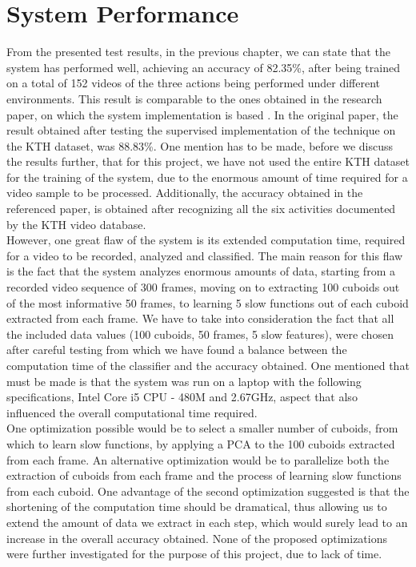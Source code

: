 \documentclass[11pt]{report}
\begin{document}
\section{System Performance}
From the presented test results, in the previous chapter, we can state that the system has performed well, achieving an accuracy of 82.35\%, after being trained on a total of 152 videos of the three actions being performed under different environments. This result is comparable to the ones obtained in the research paper, on which the system implementation is based \cite{main}. In the original paper, the result obtained after testing the supervised implementation of the technique on the KTH dataset, was 88.83\%. One mention has to be made, before we discuss the results further, that for this project, we have not used the entire KTH dataset for the training of the system, due to the enormous amount of time required for a video sample to be processed. Additionally, the accuracy obtained in the referenced paper, is obtained after recognizing all the six activities documented by the KTH video database.\\
However, one great flaw of the system is its extended computation time, required for a video to be recorded, analyzed and classified. The main reason for this flaw is the fact that the system analyzes enormous amounts of data, starting from a recorded video sequence of 300 frames, moving on to extracting 100 cuboids out of the most informative 50 frames, to learning 5 slow functions out of each cuboid extracted from each frame. We have to take into consideration the fact that all the included data values (100 cuboids, 50 frames, 5 slow features), were chosen after careful testing from which we have found a balance between the computation time of the classifier and the accuracy obtained. One mentioned that must be made is that the system was run on a laptop with the following specifications, Intel Core i5 CPU - 480M and 2.67GHz, aspect that also influenced the overall computational time required. \\
One optimization possible would be to select a smaller number of cuboids, from which to learn slow functions, by applying a PCA to the 100 cuboids extracted from each frame. An alternative optimization would be to parallelize both the extraction of cuboids from each frame and the process of learning slow functions from each cuboid. One advantage of the second optimization suggested is that the shortening of the computation time should be dramatical, thus allowing us to extend the amount of data we extract in each step, which would surely lead to an increase in the overall accuracy obtained. None of the proposed optimizations were further investigated for the purpose of this project, due to lack of time.\\
\end{document}
